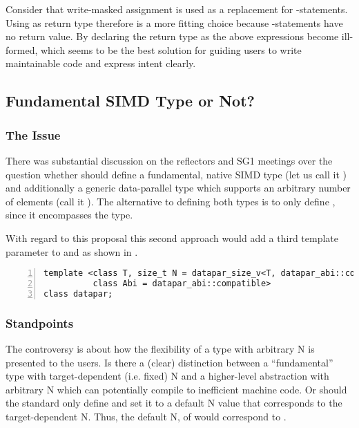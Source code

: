 Consider that write-masked assignment is used as a replacement for -statements.
Using \void as return type therefore is a more fitting choice because -statements have no return value.
By declaring the return type as \void the above expressions become ill-formed, which seems to be the best solution for guiding users to write maintainable code and express intent clearly.

\subsection{Fundamental SIMD Type or Not?}
\subsubsection{The Issue}
There was substantial discussion on the reflectors and SG1 meetings over the question whether \CC{} should define a fundamental, native SIMD type (let us call it ) and additionally a generic data-parallel type which supports an arbitrary number of elements (call it ).
The alternative to defining both types is to only define , since it encompasses the  type.

With regard to this proposal this second approach would add a third template parameter to \datapar and \mask as shown in .
\begin{lstlisting}[style=Vc,numbers=left,float,label=lst:datapar N,caption={
  Possible declaration of the class template parameters of a \datapar class with arbitrary width.
}]
template <class T, size_t N = datapar_size_v<T, datapar_abi::compatible>,
          class Abi = datapar_abi::compatible>
class datapar;
\end{lstlisting}

\subsubsection{Standpoints}
The controversy is about how the flexibility of a type with arbitrary \code N is presented to the users.
Is there a (clear) distinction between a “fundamental” type with target-dependent (i.e. fixed) \code N and a higher-level abstraction with arbitrary \code N which can potentially compile to inefficient machine code.
Or should the \CC{} standard only define  and set it to a default \code N value that corresponds to the target-dependent \code N.
Thus, the default \code N, of  would correspond to .

